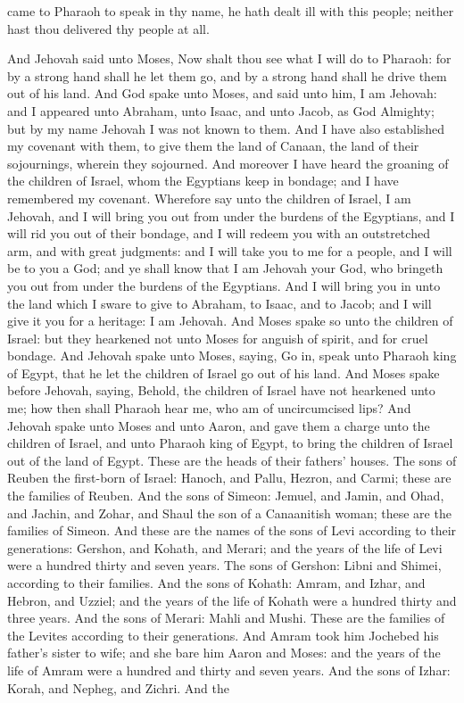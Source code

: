 came to Pharaoh to speak in thy name, he hath dealt ill with this people; neither hast thou delivered thy people at all. 

And Jehovah said unto Moses, Now shalt thou see what I will do to Pharaoh: for by a strong hand shall he let them go, and by a strong hand shall he drive them out of his land.  And God spake unto Moses, and said unto him, I am Jehovah: and I appeared unto Abraham, unto Isaac, and unto Jacob, as God Almighty; but by my name Jehovah I was not known to them. And I have also established my covenant with them, to give them the land of Canaan, the land of their sojournings, wherein they sojourned. And moreover I have heard the groaning of the children of Israel, whom the Egyptians keep in bondage; and I have remembered my covenant. Wherefore say unto the children of Israel, I am Jehovah, and I will bring you out from under the burdens of the Egyptians, and I will rid you out of their bondage, and I will redeem you with an outstretched arm, and with great judgments: and I will take you to me for a people, and I will be to you a God; and ye shall know that I am Jehovah your God, who bringeth you out from under the burdens of the Egyptians. And I will bring you in unto the land which I sware to give to Abraham, to Isaac, and to Jacob; and I will give it you for a heritage: I am Jehovah. And Moses spake so unto the children of Israel: but they hearkened not unto Moses for anguish of spirit, and for cruel bondage.  And Jehovah spake unto Moses, saying, Go in, speak unto Pharaoh king of Egypt, that he let the children of Israel go out of his land. And Moses spake before Jehovah, saying, Behold, the children of Israel have not hearkened unto me; how then shall Pharaoh hear me, who am of uncircumcised lips? And Jehovah spake unto Moses and unto Aaron, and gave them a charge unto the children of Israel, and unto Pharaoh king of Egypt, to bring the children of Israel out of the land of Egypt.  These are the heads of their fathers’ houses. The sons of Reuben the first-born of Israel: Hanoch, and Pallu, Hezron, and Carmi; these are the families of Reuben. And the sons of Simeon: Jemuel, and Jamin, and Ohad, and Jachin, and Zohar, and Shaul the son of a Canaanitish woman; these are the families of Simeon. And these are the names of the sons of Levi according to their generations: Gershon, and Kohath, and Merari; and the years of the life of Levi were a hundred thirty and seven years. The sons of Gershon: Libni and Shimei, according to their families. And the sons of Kohath: Amram, and Izhar, and Hebron, and Uzziel; and the years of the life of Kohath were a hundred thirty and three years. And the sons of Merari: Mahli and Mushi. These are the families of the Levites according to their generations. And Amram took him Jochebed his father’s sister to wife; and she bare him Aaron and Moses: and the years of the life of Amram were a hundred and thirty and seven years. And the sons of Izhar: Korah, and Nepheg, and Zichri. And the 